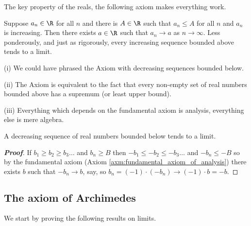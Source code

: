 The key property of the reals, the following axiom makes everything work.

\begin{axiom}\label{axm:fundamental_axiom_of_analysis}
Suppose $a_n\in\R$ for all $n$ and there is $A\in\R$ such that $a_n\leq A$ for all $n$ and $a_n$ is increasing. Then there exists $a\in\R$ such that $a_n\to a$ as $n\to\infty$. Less ponderously, and just as rigorously, every increasing sequence bounded above tends to a limit.
\end{axiom}

\begin{remark}
\ben
\item [(i)] We could have phrased the Axiom with decreasing sequences bounded below.
\item [(ii)] The Axiom is equivalent to the fact that every non-empty set of real numbers bounded above has a supremum (or least upper bound).
\item [(iii)] Everything which depends on the fundamental axiom is analysis, everything else is mere algebra.
\een
\end{remark}

\begin{proposition}\label{pro:decreasing_sequence_bounded_below}
A decreasing sequence of real numbers bounded below tends to a limit.
\end{proposition}

\begin{proof}[\bf Proof]
If $b_1 \geq b_2 \geq b_3 \ldots $ and $b_n \geq B$ then $-b_1 \leq -b_2 \leq -b_3 \ldots$ and $-b_n \leq -B$ so by the fundamental axiom (Axiom \ref{axm:fundamental_axiom_of_analysis}) there exists $b$ such that $-b_n \rightarrow b$, say, so $b_n = (-1)\cdot(-b_n) \rightarrow (-1)\cdot b = - b$.
\end{proof}


\subsection{The axiom of Archimedes}

We start by proving the following results on limits.

